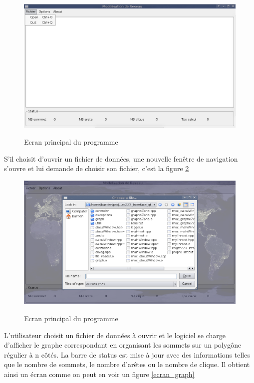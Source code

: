 \begin{figure}[ht]
\centering
 \fbox
 {
 \includegraphics[width=16cm]{./schema/capture_ecran_fichier.png}
 }
  \caption{\label{ecran_fichier}Ecran principal du programme}
\end{figure}

S'il choisit d'ouvrir un fichier de donn\'ees, une nouvelle fen\^etre de navigation s'ouvre et lui demande de choisir son fichier, c'est la figure \ref{ecran_donnees}

\begin{figure}[ht]
\centering
 \fbox
 {
 \includegraphics[width=16cm]{./schema/capture_ecran_donnees.png}
 }
  \caption{\label{ecran_donnees}Ecran principal du programme}
\end{figure}

L'utilisateur choisit un fichier de donn\'ees \`a ouvrir et le logiciel se charge d'afficher le graphe correspondant en organisant les sommets sur un polyg\^one r\'egulier \`a n c\^ot\'es.
La barre de status est mise \`a jour avec des informations telles que le nombre de sommets, le nombre d'ar\^etes ou le nombre de clique. Il obtient ainsi un \'ecran comme on peut en voir un figure \ref{ecran_graph}

